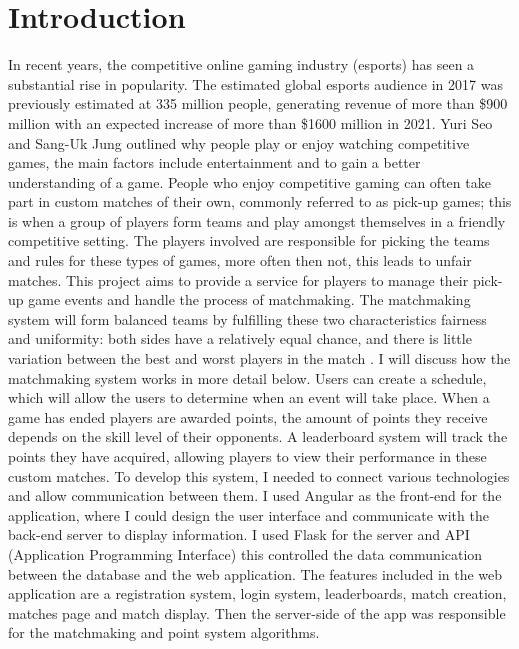 \chapter{Introduction}
In recent years, the competitive online gaming industry (esports) has seen a substantial rise in popularity. \cite{sjoblom2019esports} The estimated global esports audience in 2017 was previously estimated at 335 million people, generating revenue of more than \$900 million with an expected increase of more than \$1600 million in 2021. Yuri Seo and Sang-Uk Jung \cite{seo2016beyond} outlined why people play or enjoy watching competitive games, the main factors include entertainment and to gain a better understanding of a game. People who enjoy competitive gaming can often take part in custom matches of their own, commonly referred to as pick-up games; this is when a group of players form teams and play amongst themselves in a friendly competitive setting. The players involved are responsible for picking the teams and rules for these types of games, more often then not, this leads to unfair matches. This project aims to provide a service for players to manage their pick-up game events and handle the process of matchmaking. The matchmaking system will form balanced teams by fulfilling these two characteristics fairness and uniformity: both sides have a relatively equal chance, and there is little variation between the best and worst players in the match \cite{alman2017theoretical}. I will discuss how the matchmaking system works in more detail below. Users can create a schedule, which will allow the users to determine when an event will take place. When a game has ended players are awarded points, the amount of points they receive depends on the skill level of their opponents. A leaderboard system will track the points they have acquired, allowing players to view their performance in these custom matches.
\newpage
To develop this system, I needed to connect various technologies and allow communication between them. I used Angular as the front-end for the application, where I could design the user interface and communicate with the back-end server to display information. I used Flask for the server and API (Application Programming Interface) this controlled the data communication between the database and the web application.
The features included in the web application are a registration system, login system, leaderboards, match creation, matches page and match display. Then the server-side of the app was responsible for the matchmaking and point system algorithms.

